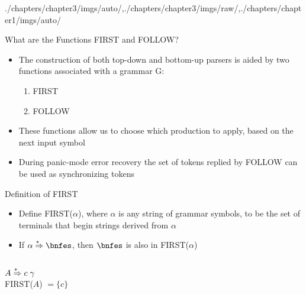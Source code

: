 \begin{graphicspathcontext}{{./chapters/chapter3/imgs/auto/},{./chapters/chapter3/imgs/raw/},{./chapters/chapter1/imgs/auto/}}
\begin{bibunit}[apalike]
\begin{frame}[background=6]{{What are the Functions} FIRST and FOLLOW?}
	\begin{itemize}
	\item The construction of both top-down and bottom-up parsers is aided by two functions associated with a grammar G:
		\begin{enumerate}
		\item FIRST
		\item FOLLOW
		\end{enumerate}
	\vfill
	\item These functions allow us to choose which production to apply, based on the next input symbol
	\vfill
	\item During panic-mode error recovery the set of tokens replied by FOLLOW can be used as synchronizing tokens
	\end{itemize}
\end{frame}

\begin{frame}{Definition of FIRST}
	\begin{itemize}
	\item Define FIRST($\alpha$), where $\alpha$ is any string of grammar symbols, to be the set of terminals that begin strings derived from $\alpha$
	\item If $\alpha \seqderiv \bnfes$, then $\bnfes$ is also in FIRST($\alpha$)
	\end{itemize}
	\vfill
	\begin{example}
		\begin{columns}
			\begin{column}[t]{.4\linewidth}
				$A \overset{*\hspace{.4em}}{\Rightarrow} c \; \gamma$ \\
				FIRST($A$) $ = \{ c \}$
			\end{column}
			\begin{column}[t]{.4\linewidth}
			\end{column}
		\end{columns}
	\end{example}
\end{frame}


\end{bibunit}
\end{graphicspathcontext}
